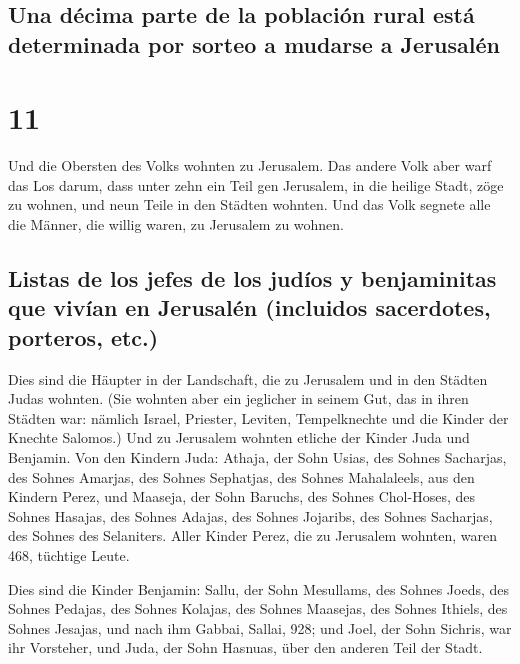 \hypertarget{una-duxe9cima-parte-de-la-poblaciuxf3n-rural-estuxe1-determinada-por-sorteo-a-mudarse-a-jerusaluxe9n}{%
\subsection{Una décima parte de la población rural está determinada por
sorteo a mudarse a
Jerusalén}\label{una-duxe9cima-parte-de-la-poblaciuxf3n-rural-estuxe1-determinada-por-sorteo-a-mudarse-a-jerusaluxe9n}}

\hypertarget{section-10}{%
\section{11}\label{section-10}}

 Und die Obersten des Volks wohnten zu Jerusalem. Das
andere Volk aber warf das Los darum, dass unter zehn ein Teil gen
Jerusalem, in die heilige Stadt, zöge zu wohnen, und neun Teile in den
Städten wohnten.  Und das Volk segnete alle die Männer,
die willig waren, zu Jerusalem zu wohnen.

\hypertarget{listas-de-los-jefes-de-los-juduxedos-y-benjaminitas-que-vivuxedan-en-jerusaluxe9n-incluidos-sacerdotes-porteros-etc.}{%
\subsection{Listas de los jefes de los judíos y benjaminitas que vivían
en Jerusalén (incluidos sacerdotes, porteros,
etc.)}\label{listas-de-los-jefes-de-los-juduxedos-y-benjaminitas-que-vivuxedan-en-jerusaluxe9n-incluidos-sacerdotes-porteros-etc.}}

 Dies sind die Häupter in der Landschaft, die zu Jerusalem
und in den Städten Judas wohnten. (Sie wohnten aber ein jeglicher in
seinem Gut, das in ihren Städten war: nämlich Israel, Priester, Leviten,
Tempelknechte und die Kinder der Knechte Salomos.)  Und zu
Jerusalem wohnten etliche der Kinder Juda und Benjamin. Von den Kindern
Juda: Athaja, der Sohn Usias, des Sohnes Sacharjas, des Sohnes Amarjas,
des Sohnes Sephatjas, des Sohnes Mahalaleels, aus den Kindern Perez,
 und Maaseja, der Sohn Baruchs, des Sohnes Chol-Hoses, des
Sohnes Hasajas, des Sohnes Adajas, des Sohnes Jojaribs, des Sohnes
Sacharjas, des Sohnes des Selaniters.  Aller Kinder Perez,
die zu Jerusalem wohnten, waren 468, tüchtige Leute.

 Dies sind die Kinder Benjamin: Sallu, der Sohn Mesullams,
des Sohnes Joeds, des Sohnes Pedajas, des Sohnes Kolajas, des Sohnes
Maasejas, des Sohnes Ithiels, des Sohnes Jesajas,  und
nach ihm Gabbai, Sallai, 928;  und Joel, der Sohn Sichris,
war ihr Vorsteher, und Juda, der Sohn Hasnuas, über den anderen Teil der
Stadt.

